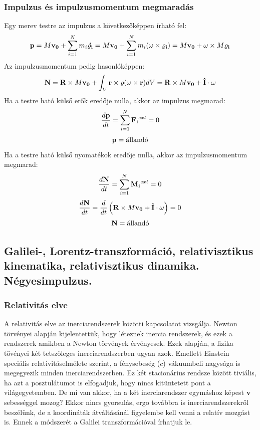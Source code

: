 \documentclass[../main.tex]{subfiles}
\begin{document}
\subsubsection*{Impulzus és impulzusmomentum megmaradás}
Egy merev testre az impulzus a következőképpen írható fel:
\begin{equation}
    \bold{p} = M \bold{v_0} + \sum_{i=1}^{N} m_i \bold{\dot{\varrho_i}} = M \bold{v_0} + \sum_{i=1}^{N} m_i (\bold{\omega} \times \bold{\varrho_i}) = M \bold{v_0} + \bold{\omega} \times M \bold{\varrho_i}
\end{equation}
Az impulzusmomentum pedig hasonlóképpen:
\begin{equation}
    \bold{N} = \bold{R} \times M \bold{v_0} + \int_{V} \bold{r} \times \varrho (\bold{\omega} \times \bold{r}) dV = \bold{R} \times M \bold{v_0} + \bold{\hat{I}} \cdot \bold{\omega}
\end{equation}
Ha a testre ható külső erők eredője nulla, akkor az impulzus megmarad:
\begin{equation}
    \frac{d\bold{p}}{dt} = \sum_{i=1}^{N} \bold{F_i}^{ext} = 0
\end{equation}
\begin{equation}
    \bold{p} = \text{állandó}
\end{equation}
Ha a testre ható külső nyomatékok eredője nulla, akkor az impulzusmomentum megmarad:
\begin{equation}
    \frac{d\bold{N}}{dt} = \sum_{i=1}^{N} \bold{M_i}^{ext} = 0
\end{equation}
\begin{equation}
    \frac{d\bold{N}}{dt} = \frac{d}{dt} \left(\bold{R} \times M \bold{v_0} + \bold{\hat{I}} \cdot \bold{\omega}\right) = 0
\end{equation}
\begin{equation}
    \bold{N} = \text{állandó}
\end{equation}  

\subsection{Galilei-, Lorentz-transzformáció, relativisztikus kinematika, relativisztikus dinamika. Négyesimpulzus.}

\subsubsection{Relativitás elve}
 A relativitás elve az inerciarendszerek közötti kapcsolatot vizsgálja. Newton törvényei alapján kijelentettük, hogy léteznek inercia rendszerek, és ezek a rendszerek amikben a 
 Newton törvények érvényesek. Ezek alapján, a fizika tövényei két tetszőleges inerciarendszerben ugyan azok. Emellett Einstein speciális relativitáselmélete szerint, a fénysebeség ($c$)
 vákuumbeli nagysága is megegyezik minden inerciarendszerben. Ez két stacionárius rendsze között tiviális, ha azt a posztulátumot is elfogadjuk, hogy nincs kitüntetett pont a világegyetemben.
 De mi van akkor, ha a két inerciarendszer egymáshoz képest $\bold{v}$ sebességgel mozog? Ekkor nincs gyorsulás, ergo továbbra is inerciarendszerekről beszélünk, de a koordináták átváltásánál figyelembe kell venni a relatív mozgást is.
 Ennek a módszerét a Galilei transzformációval írhatjuk le.
\end{document}
